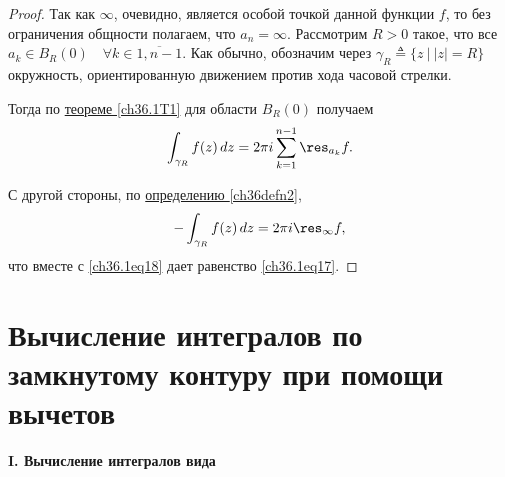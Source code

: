 \begin{proof}
Так как $\infty$, очевидно, является особой точкой данной функции $f$, то без ограничения общности полагаем, что $a_n = \infty$. Рассмотрим $R > 0$ такое, что все $a_k \in B_R(0) \quad \forall k \in \overline{1, n - 1}$. Как обычно, обозначим через $\gamma_R \triangleq \{ z \: \big| \: |z| = R\}$ окружность, ориентированную движением против хода часовой стрелки.

Тогда по \hyperref[ch36.1T1]{теореме \ref{ch36.1T1}} для области $B_R(0)$ получаем
\begin{equation} \label{ch36.1eq18}
\int_{\gamma_R} f(z) \,dz = 2\pi i \sum_{k = 1}^{n - 1} \res_{a_k} f.
\end{equation}

С другой стороны, по \hyperref[ch36defn2]{определению \ref{ch36defn2}},
$$
- \int_{\gamma_R} f(z) \,dz = 2\pi i \res_{\infty} f,
$$
что вместе с \eqref{ch36.1eq18} дает равенство \eqref{ch36.1eq17}.
\end{proof}

\section{Вычисление интегралов по замкнутому контуру при помощи вычетов}

{\bf I. Вычисление интегралов вида}

